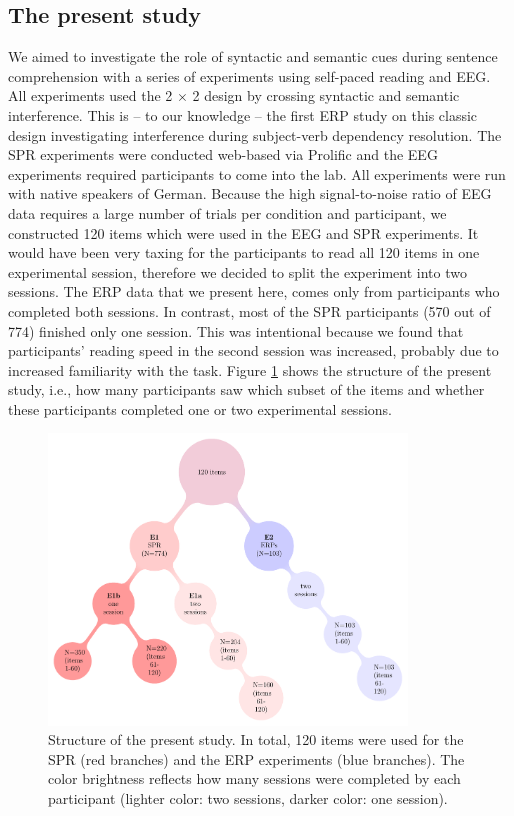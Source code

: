 \documentclass[a4paper, man, floatsintext]{apa7}
\begin{document}
\subsection{The present study}

We aimed to investigate the role of syntactic and semantic cues during sentence comprehension with a series of experiments using self-paced reading and EEG. All experiments used the 2 $\times$ 2 design by \citet{vandyke07} crossing syntactic and semantic interference. This is -- to our knowledge -- the first ERP study on this classic design investigating interference during subject-verb dependency resolution. The SPR experiments were conducted web-based via Prolific and the EEG experiments required participants to come into the lab. All experiments were run with native speakers of German. Because the high signal-to-noise ratio of EEG data requires a large number of trials per condition and participant, we constructed 120 items which were used in the EEG and SPR experiments. It would have been very taxing for the participants to read all 120 items in one experimental session, therefore we decided to split the experiment into two sessions. The ERP data that we present here, comes only from participants who completed both sessions. In contrast, most of the SPR participants (570 out of 774) finished only one session. This was intentional because we found that participants' reading speed in the second session was increased, probably due to increased familiarity with the task. Figure \ref{fig:project_str} shows the structure of the present study, i.e., how many participants saw which subset of the items and whether these participants completed one or two experimental sessions.

\begin{figure}[H]
    \caption{Structure of the present study. In total, 120 items were used for the SPR (red branches) and the ERP experiments (blue branches). The color brightness reflects how many sessions were completed by each participant (lighter color: two sessions, darker color: one session).}
    \label{fig:project_str}
    \centering
    \includegraphics[width=0.85\textwidth]{images/pandora_project_structure_figure.pdf}
\end{figure}
\end{document}
